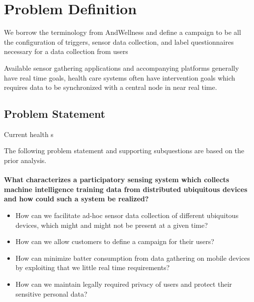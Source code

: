 
\section{Problem Definition} 
\label{sec:problem_definition}


We borrow the terminology from AndWellness \parencite{hicks2010andwellness} and define a campaign to be all the configuration of triggers, sensor data collection, and label questionnaires necessary for a data collection from users    

Available sensor gathering applications and accompanying platforms generally have real time goals, health care systems often have intervention goals which requires data to be synchronized with a central node in near real time. 


\subsection{Problem Statement}
\label{sub:problem_statement}

Current health s

The following problem statement and supporting subquestions are based on the prior analysis.
\\\\
\textbf{What characterizes a participatory sensing system which collects machine intelligence training data from distributed ubiquitous devices and how could such a system be realized?}

\begin{itemize}
    \item How can we facilitate ad-hoc sensor data collection of different ubiquitous devices, which might and might not be present at a given time? 
    \item How can we allow customers to define a campaign for their users?
    \item How can minimize batter consumption from data gathering on mobile devices by exploiting that we little real time requirements?
    \item How can we maintain legally required privacy of users and protect their sensitive personal data? 
\end{itemize}

